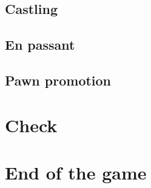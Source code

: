 \documentclass[a4paper,8pt]{extarticle}
\begin{document}
\subsection{Castling}

\subsection{En passant}

\subsection{Pawn promotion}

\section{Check}

\section{End of the game}
\end{document}

